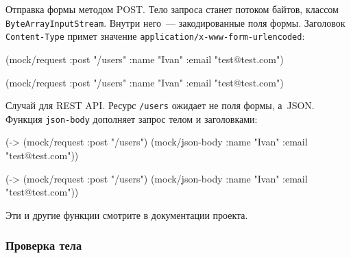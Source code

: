 \fi


\noindent
Отправка формы методом POST. Тело запроса станет потоком байтов, классом
\texttt{ByteArrayInputStream}. Внутри него~--- закодированные поля
формы. Заголовок \verb|Content-Type| примет значение
\verb|application/x-www-form-urlencoded|:

\ifnarrow

\begin{english}
  \begin{clojure}
(mock/request :post "/users"
  {:name "Ivan" :email "test@test.com"})
  \end{clojure}
\end{english}

\else

\begin{english}
  \begin{clojure}
(mock/request :post "/users"
              {:name "Ivan" :email "test@test.com"})
  \end{clojure}
\end{english}

\fi


\noindent
Случай для REST API. Ресурс \verb|/users| ожидает не поля формы, а~JSON.
Функция \verb|json-body| дополняет запрос телом и заголовками:

\ifnarrow

\begin{english}
  \begin{clojure}
(-> (mock/request :post "/users")
    (mock/json-body
      {:name "Ivan"
       :email "test@test.com"}))
  \end{clojure}
\end{english}

\else

\begin{english}
  \begin{clojure}
(-> (mock/request :post "/users")
    (mock/json-body
      {:name "Ivan" :email "test@test.com"}))
  \end{clojure}
\end{english}

\fi

\noindent
Эти и другие функции смотрите в документации проекта.

\subsubsection*{Проверка тела}

